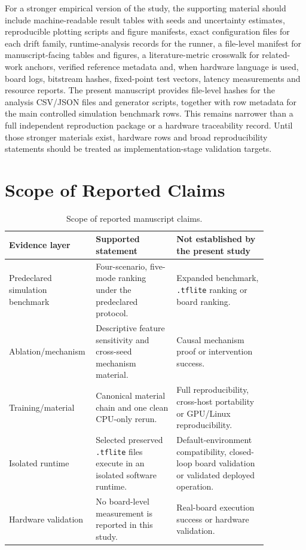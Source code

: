 \documentclass[11pt]{article}
\newcommand{\softwarehil}{controlled simulation}
\begin{document}
For a stronger empirical version of the study, the supporting material should
include machine-readable result tables with seeds and uncertainty estimates,
reproducible plotting scripts and figure manifests, exact configuration files
for each drift family, runtime-analysis records for the runner, a file-level
manifest for manuscript-facing tables and figures, a literature-metric
crosswalk for related-work anchors, verified reference metadata and, when
hardware language is used, board logs, bitstream hashes, fixed-point test
vectors, latency measurements and resource reports.  The present manuscript
provides file-level hashes for the analysis CSV/JSON files and generator
scripts, together with row metadata for the main \softwarehil{} benchmark rows.
This remains narrower than a full independent reproduction package or a
hardware traceability record.
Until those stronger materials exist, hardware rows and broad reproducibility
statements should be treated as implementation-stage validation targets.

\section{Scope of Reported Claims}

\begin{table}[htbp]
\centering
\small
\begin{tabular}{@{}>{\raggedright\arraybackslash}p{0.22\linewidth}>{\raggedright\arraybackslash}p{0.30\linewidth}>{\raggedright\arraybackslash}p{0.34\linewidth}@{}}
\toprule
Evidence layer & Supported statement & Not established by the present study \\
\midrule
Predeclared simulation benchmark & Four-scenario, five-mode ranking under the
predeclared protocol. & Expanded benchmark, \texttt{.tflite} ranking or board ranking. \\
\addlinespace
Ablation/mechanism & Descriptive feature sensitivity and cross-seed
mechanism material. & Causal mechanism proof or intervention success. \\
\addlinespace
Training/material & Canonical material chain and one clean CPU-only rerun. &
Full reproducibility, cross-host portability or GPU/Linux reproducibility. \\
\addlinespace
Isolated runtime & Selected preserved \texttt{.tflite} files execute in an
isolated software runtime. & Default-environment compatibility,
closed-loop board validation or validated deployed operation. \\
\addlinespace
Hardware validation & No board-level measurement is reported in this study. &
Real-board execution success or hardware validation. \\
\bottomrule
\end{tabular}
\caption{Scope of reported manuscript claims.}
\label{tab:validation-scope}
\end{table}
\end{document}
